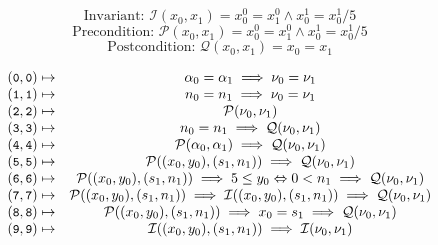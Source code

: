 \newcommand\rinv[3]{\ensuremath{(\cc{#1}, \cc{#2}) }}
\newcommand\iinv[2]{\ensuremath{\mathcal{I}(#1, #2)}}
\newcommand\precondition[2]{\ensuremath{\mathcal{P}(#1, #2)}}
\newcommand\postcondition[2]{\ensuremath{\mathcal{Q}(#1, #2)}}

$$
\text{Invariant: }\iinv{x_0}{x_1} = x_0^0 = x_1^0 \land x_0^1 = x_0^1 / 5
$$
$$
\text{Precondition: }\precondition{x_0}{x_1} = x_0^0 = x_1^0 \land x_0^1 = x_0^1 / 5
$$
$$
\text{Postcondition: }\postcondition{x_0}{x_1} = x_0 = x_1
$$

$$
\begin{array}{ r c l}
  \rinv{0}{0} &\mapsto& \alpha_0 = \alpha_1 \implies \nu_0 = \nu_1 \\
  \rinv{1}{1} &\mapsto& n_0 = n_1 \implies \nu_0 = \nu_1 \\
  \rinv{2}{2} &\mapsto& \precondition{\nu_0}{\nu_1} \\
  \rinv{3}{3} &\mapsto& n_0 = n_1 \implies \postcondition{\nu_0}{\nu_1} \\
  \rinv{4}{4} &\mapsto& \precondition{\alpha_0}{\alpha_1} \implies \postcondition{\nu_0}{\nu_1} \\
  \rinv{5}{5} &\mapsto& \precondition{(x_0, y_0)}{(s_1, n_1)} \implies \postcondition{\nu_0}{\nu_1} \\
  \rinv{6}{6}  &\mapsto&  \precondition{(x_0, y_0)}{(s_1, n_1)} 
                          \implies 5 \leq y_0 \Leftrightarrow 0 < n_1 
                          \implies \postcondition{\nu_0}{\nu_1}   \\
  \rinv{7}{7}  &\mapsto&  \precondition{(x_0, y_0)}{(s_1, n_1)} 
                          \implies \iinv{(x_0, y_0)}{(s_1, n_1)} 
                          \implies \postcondition{\nu_0}{\nu_1}   \\
  \rinv{8}{8}  &\mapsto&  \precondition{(x_0, y_0)}{(s_1, n_1)} 
                          \implies x_0 = s_1 
                          \implies \postcondition{\nu_0}{\nu_1} \\
  \rinv{9}{9}  &\mapsto& \iinv{(x_0, y_0)}{(s_1, n_1)} \implies \iinv{\nu_0}{\nu_1}\\
\end{array}
$$

